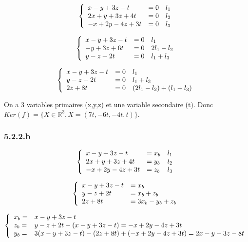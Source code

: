 \documentclass[]{book}
\theoremstyle{definition}
\newcommand{\bb}[1]{\mathbb{#1}}
\newcommand{\R}{\bb{R}}
\begin{document}
$$
\left\{ 
\begin{array}{l l l}
x -y +3z -t & = 0 & l_1 \\
2x + y + 3z + 4t & = 0 & l_2 \\
-x + 2y -4z + 3t & = 0 & l_3 \\
\end{array}
\right. 
$$

$$
\left\{ 
\begin{array}{l l l}
x -y +3z -t & = 0 & l_1 \\
-y + 3z + 6t & = 0 & 2l_1 - l_2 \\
y -z + 2t & = 0 & l_1 + l_3 \\
\end{array}
\right. 
$$

$$
\left\{ 
\begin{array}{l l l}
x -y +3z -t & = 0 & l_1 \\
y -z + 2t & = 0 & l_1 + l_3 \\
2z + 8t & = 0 & (2l_1 - l_2)+(l_1 + l_3) \\
\end{array}
\right. 
$$

On a 3 variables primaires (x,y,z) et une variable secondaire (t). Donc $Ker(f)=\{X \in \R^3, X=(7t,-6t, -4t, t)\}$.


\subsubsection*{5.2.2.b}
$$
\left\{ 
\begin{array}{l l l}
x -y +3z -t & = x_b & l_1 \\
2x + y + 3z + 4t & = y_b & l_2 \\
-x + 2y -4z + 3t & = z_b & l_3 \\
\end{array}
\right. 
$$

$$
\left\{ 
\begin{array}{l l}
x -y +3z -t & = x_b \\
y -z + 2t & = x_b+z_b \\
2z + 8t & = 3x_b-y_b+z_b \\
\end{array}
\right. 
$$

$$
\left\{ 
\begin{array}{l l}
x_b = & x -y +3z -t \\
z_b = & y -z + 2t - (x -y +3z -t) = -x +2y -4z +3t \\
y_b = & 3(x -y +3z -t) -(2z + 8t) + (-x +2y -4z +3t) = 2x -y +3z -8t \\
\end{array}
\right. 
$$
\end{document}
